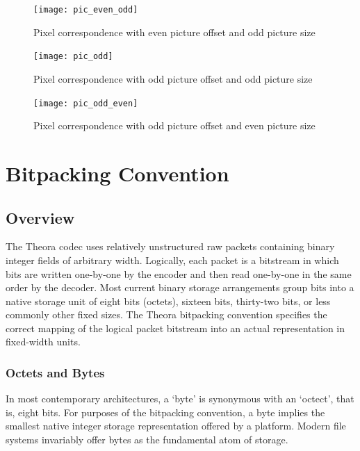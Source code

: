\documentclass[9pt,letterpaper]{book}
\numberwithin{equation}{chapter}
\numberwithin{figure}{chapter}
\numberwithin{table}{chapter}
\begin{document}
\begin{figure}[htbp]
\begin{center}
\texttt{[image: pic\_even\_odd]}
\end{center}
\caption{Pixel correspondence with even picture offset and 
 odd picture size}
\label{fig:pic_even_odd}
\end{figure}

\begin{figure}[htbp]
\begin{center}
\texttt{[image: pic\_odd]}
\end{center}
\caption{Pixel correspondence with odd picture offset and 
 odd picture size}
\label{fig:pic_odd}
\end{figure}

\begin{figure}[htbp]
\begin{center}
\texttt{[image: pic\_odd\_even]}
\end{center}
\caption{Pixel correspondence with odd picture offset and 
 even picture size}
\label{fig:pic_odd_even}
\end{figure}


\chapter{Bitpacking Convention}
\label{sec:bitpacking}

\section{Overview}

The Theora codec uses relatively unstructured raw packets containing
 binary integer fields of arbitrary width.
Logically, each packet is a bitstream in which bits are written one-by-one by
 the encoder and then read one-by-one in the same order by the decoder.
Most current binary storage arrangements group bits into a native storage unit
 of eight bits (octets), sixteen bits, thirty-two bits, or less commonly other
 fixed sizes.
The Theora bitpacking convention specifies the correct mapping of the logical
 packet bitstream into an actual representation in fixed-width units.

\subsection{Octets and Bytes}

In most contemporary architectures, a `byte' is synonymous with an `octect',
 that is, eight bits.
For purposes of the bitpacking convention, a byte implies the smallest native
 integer storage representation offered by a platform.
Modern file systems invariably offer bytes as the fundamental atom of storage.
\end{document}
